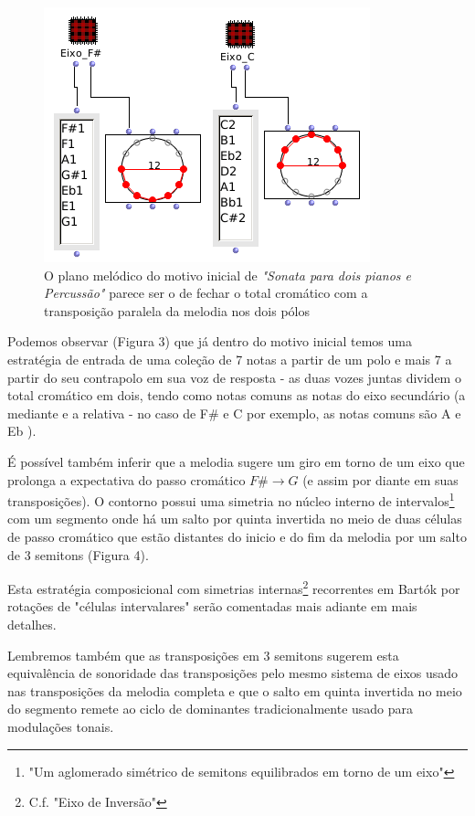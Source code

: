 \documentclass[
	12pt,				%
	openright,			%
	twoside,			%
	a4paper,			%
	english,			%
	french,				%
	spanish,			%
	brazil				%
	]{abntex2}
\begin{document}
\begin{figure}[!h]
	\caption{\label{fig_grafico}O plano melódico do motivo inicial de \textit{"Sonata para dois pianos e Percussão"}  parece ser o de fechar o total cromático com a transposição paralela da melodia nos dois pólos }
	\begin{center}
	    \includegraphics[scale=0.7]{axis/sonata2P_OM.png}
	\end{center}
\end{figure}


Podemos observar (Figura 3) que já dentro do motivo inicial temos uma estratégia de entrada de uma coleção de 7 notas a partir de um polo e mais 7 a partir do seu contrapolo em sua voz de resposta - as duas vozes juntas dividem o total cromático em dois, tendo como notas comuns as notas do eixo secundário (a mediante e a relativa - no caso de F\# e C por exemplo, as notas comuns são A e Eb ).

É possível também inferir que a melodia sugere um giro em torno de um eixo que prolonga a expectativa do passo cromático $F\# \rightarrow G$ (e assim por diante em suas transposições). O contorno possui uma simetria no núcleo interno de intervalos\footnote{"Um aglomerado simétrico de semitons equilibrados em torno de um eixo"\cite[ p.120]{straus2004}} com um segmento onde há um salto por quinta invertida no meio de duas células de passo cromático que estão distantes do inicio e do fim da melodia por um salto de 3 semitons (Figura 4). 

Esta estratégia composicional com simetrias internas\footnote{C.f. "Eixo de Inversão"\cite[ p.121]{straus2004}} recorrentes em Bartók por rotações de "células intervalares"\cite[ p.128]{susanni_antokoletz2012music} serão comentadas mais adiante em mais detalhes. 

Lembremos também que as transposições em 3 semitons sugerem esta equivalência de sonoridade das transposições pelo mesmo sistema de eixos usado nas transposições da melodia completa e que o salto em quinta invertida no meio do segmento remete ao ciclo de dominantes tradicionalmente usado para modulações tonais.
\end{document}
